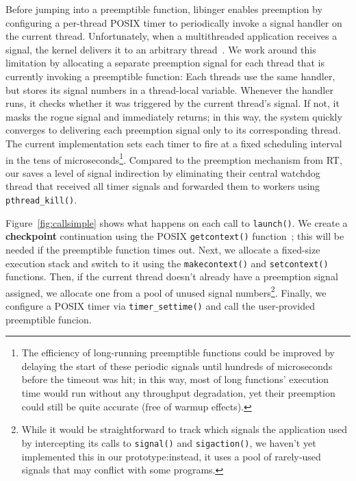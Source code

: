 Before jumping into a preemptible function, libinger enables preemption by
configuring a per-thread POSIX timer to periodically invoke a signal handler on the
current thread.  Unfortunately, when a multithreaded application receives a signal,
the kernel delivers it to an arbitrary thread~\cite{signal-manpage}.  We work around
this limitation by allocating a separate preemption signal for each thread that is
currently invoking a preemptible function:  Each threads use the same handler, but
stores its signal numbers in a thread-local variable.  Whenever the handler runs, it
checks whether it was triggered by the current thread's signal.  If not, it masks the
rogue signal and immediately returns; in this way, the system quickly converges to
delivering each preemption signal only to its corresponding thread.  The current
implementation sets each timer to fire at a fixed scheduling interval in the tens of
microseconds\footnote{The efficiency of long-running preemptible functions could be
improved by delaying the start of these periodic signals until
hundreds of microseconds before the timeout was hit; in this way, most of long
functions' execution time would run without any throughput degradation, yet their
preemption could still be quite accurate (free of warmup effects).}.  Compared to the
preemption mechanism from RT, our saves a level of signal indirection by eliminating
their central watchdog thread that received all timer signals and forwarded them to
workers using \texttt{pthread\_kill()}.

Figure~\ref{fig:callsimple} shows what happens on each call to \texttt{launch()}.
We create a \textbf{checkpoint} continuation using the POSIX
\texttt{getcontext()} function~\cite{getcontext-manpage}; this will be needed if the
preemptible
function times out.  Next, we allocate a fixed-size execution stack and switch to it
using the \texttt{makecontext()} and \texttt{setcontext()} functions.  Then, if the
current thread doesn't already have a preemption signal assigned, we allocate one
from a pool of unused signal numbers\footnote{While it would be straightforward to
track which signals the application used by intercepting its calls to
\texttt{signal()} and \texttt{sigaction()}, we haven't yet implemented this in our
prototype:\@ instead, it uses a pool of rarely-used signals that may conflict with
some programs.}.  Finally, we configure a POSIX timer via
\texttt{timer\_settime()} and call the user-provided preemptible funcion.

